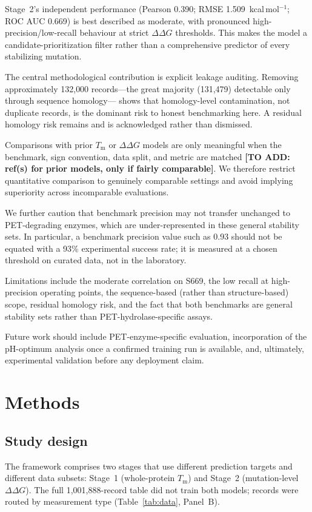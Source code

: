 \documentclass[11pt]{article}
\newcommand{\filler}[1]{\colorbox{filleryellow}{\bfseries [TO ADD: #1]}}
\newcommand{\ddg}{\ensuremath{\Delta\Delta G}}
\newcommand{\Tm}{\ensuremath{T_\mathrm{m}}}
\begin{document}
Stage~2's independent performance (Pearson 0.390; RMSE 1.509~kcal\,mol$^{-1}$; ROC AUC 0.669) is
best described as moderate, with pronounced high-precision/low-recall behaviour at strict \ddg{}
thresholds. This makes the model a candidate-prioritization filter rather than a comprehensive
predictor of every stabilizing mutation.

The central methodological contribution is explicit leakage auditing. Removing approximately
132{,}000 records---the great majority (131{,}479) detectable only through sequence homology---
shows that homology-level contamination, not duplicate records, is the dominant risk to honest
benchmarking here. A residual homology risk remains and is acknowledged rather than dismissed.

Comparisons with prior \Tm{} or \ddg{} models are only meaningful when the benchmark, sign
convention, data split, and metric are matched \filler{ref(s) for prior models, only if fairly comparable}. We therefore restrict quantitative comparison to genuinely comparable settings and
avoid implying superiority across incomparable evaluations.

We further caution that benchmark precision may not transfer unchanged to PET-degrading enzymes,
which are under-represented in these general stability sets. In particular, a benchmark precision
value such as 0.93 should not be equated with a 93\% experimental success rate; it is measured at
a chosen threshold on curated data, not in the laboratory.

Limitations include the moderate correlation on S669, the low recall at high-precision operating
points, the sequence-based (rather than structure-based) scope, residual homology risk, and the
fact that both benchmarks are general stability sets rather than PET-hydrolase-specific assays.

Future work should include PET-enzyme-specific evaluation, incorporation of the pH-optimum
analysis once a confirmed training run is available, and, ultimately, experimental validation
before any deployment claim.

\section{Methods}

\subsection{Study design}
The framework comprises two stages that use different prediction targets and different data
subsets: Stage~1 (whole-protein \Tm) and Stage~2 (mutation-level \ddg). The full 1{,}001{,}888-record
table did not train both models; records were routed by measurement type (Table~\ref{tab:data},
Panel~B).
\end{document}

